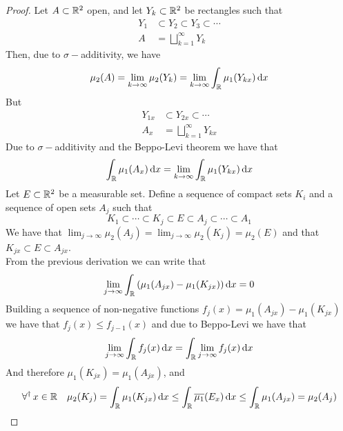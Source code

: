 \documentclass[../complete.tex]{subfiles}
\begin{document}
\begin{proof}
	Let $A\subset\mathbb{R}^2$ open, and let $Y_k\subset\mathbb{R}^2$ be rectangles such that
	\begin{equation*}
		\begin{aligned}
			Y_1&\subset Y_2\subset Y_3\subset\cdots\\
			A&=\bigsqcup_{k=1}^\infty Y_k
		\end{aligned}
	\end{equation*}
	Then, due to $\sigma-$additivity, we have
	\begin{equation*}
		\mu_2(A)=\lim_{k\to\infty}\mu_2(Y_k)=\lim_{k\to\infty}\int_{\mathbb{R}}^{}\mu_1(Y_{kx})\operatorname{d\!} x
	\end{equation*}
	But
	\begin{equation*}
		\begin{aligned}
			Y_{1x}&\subset Y_{2x}\subset\cdots\\
			A_x&=\bigsqcup_{k=1}^\infty Y_{kx}
		\end{aligned}
	\end{equation*}
	Due to $\sigma-$additivity and the Beppo-Levi theorem we have that
	\begin{equation*}
		\int_{\mathbb{R}}^{}\mu_1(A_x)\operatorname{d\!} x=\lim_{k\to\infty}\int_{\mathbb{R}}^{}\mu_1(Y_{kx})\operatorname{d\!} x
	\end{equation*}
	Let $E\subset\mathbb{R}^2$ be a measurable set. Define a sequence of compact sets $K_i$ and a sequence of open sets $A_j$ such that
	\begin{equation*}
		K_1\subset\cdots\subset K_j\subset E\subset A_j\subset\cdots\subset A_1
	\end{equation*}
	We have that $\lim_{j\to\infty}\mu_2(A_j)=\lim_{j\to\infty}\mu_2(K_j)=\mu_2(E)$ and that $K_{jx}\subset E\subset A_{jx}$.\\
	From the previous derivation we can write that
	\begin{equation*}
		\lim_{j\to\infty}\int_{\mathbb{R}}\left( \mu_1(A_{jx})-\mu_1(K_{jx}) \right)\operatorname{d\!} x=0
	\end{equation*}
	Building a sequence of non-negative functions $f_j(x)=\mu_1(A_{jx})-\mu_1(K_{jx})$ we have that $f_j(x)\le f_{j-1}(x)$ and due to Beppo-Levi we have that
	\begin{equation*}
		\lim_{j\to\infty}\int_{\mathbb{R}}f_j(x)\operatorname{d\!} x=\int_{\mathbb{R}}^{}\lim_{j\to\infty}f_{j}(x)\operatorname{d\!} x
	\end{equation*}
	And therefore $\mu_1(K_{jx})=\mu_1(A_{jx})$, and
	\begin{equation*}
		\operatorname{\forall^\dagger} x\in\mathbb{R}\quad\mu_2(K_j)=\int_{\mathbb{R}}^{}\mu_1(K_{jx})\operatorname{d\!} x\le\int_{\mathbb{R}}^{}\overline{\mu_1}(E_x)\operatorname{d\!} x\le\int_{\mathbb{R}}^{}\mu_1(A_{jx})=\mu_2(A_j)
	\end{equation*}
\end{proof}
\end{document}
